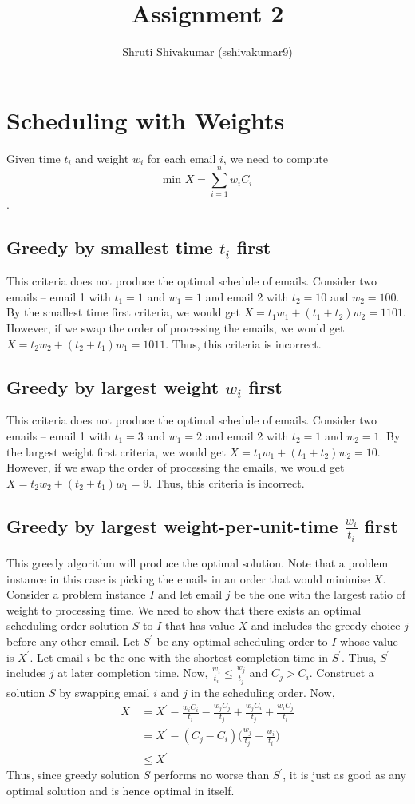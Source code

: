\documentclass[10pt,a4paper]{article}
\title{Assignment 2}
\author{Shruti Shivakumar (sshivakumar9)}
\begin{document}
\maketitle

\section{Scheduling with Weights}
Given time $t_i$ and weight $w_i$ for each email $i$, we need to compute $$\text{min } X = \sum_{i=1}^{n} w_iC_i$$.
\subsection{Greedy by smallest time $t_i$ first}
This criteria does not produce the optimal schedule of emails. Consider two emails -- email 1 with $t_1 = 1$ and $w_1 = 1$ and email 2 with $t_2 = 10$ and $w_2 = 100$. By the smallest time first criteria, we would get $X = t_1w_1 + (t_1 + t_2)w_2 = 1101$. However, if we swap the order of processing the emails, we would get $X = t_2w_2 + (t_2 + t_1)w_1 = 1011$. Thus, this criteria is incorrect.
\subsection{Greedy by largest weight $w_i$ first}
This criteria does not produce the optimal schedule of emails. Consider two emails -- email 1 with $t_1 = 3$ and $w_1 = 2$ and email 2 with $t_2 = 1$ and $w_2 = 1$. By the largest weight first criteria, we would get $X = t_1w_1 + (t_1 + t_2)w_2 = 10$. However, if we swap the order of processing the emails, we would get $X = t_2w_2 + (t_2 + t_1)w_1 = 9$. Thus, this criteria is incorrect.
\subsection{Greedy by largest weight-per-unit-time $\frac{w_i}{t_i}$ first}
This greedy algorithm will produce the optimal solution. Note that a problem instance in this case is picking the emails in an order that would minimise $X$. Consider a problem instance $I$ and let email $j$ be the one with the largest ratio of weight to processing time. We need to show that there exists an optimal scheduling order solution $S$ to $I$ that has value $X$ and includes the greedy choice $j$ before any other email. Let $S^\prime$ be any optimal scheduling order to $I$ whose value is $X^\prime$. Let email $i$ be the one with the shortest completion time in $S^\prime$. Thus, $S^\prime$ includes $j$ at later completion time. Now, $\frac{w_i}{t_i} \leq \frac{w_j}{t_j}$ and $C_j > C_i$. Construct a solution $S$ by swapping email $i$ and $j$ in the scheduling order. Now, 
\begin{align*}
X &= X^\prime - \frac{w_iC_i}{t_i} - \frac{w_jC_j}{t_j} + \frac{w_jC_i}{t_j} + \frac{w_iC_j}{t_i}\\
\quad &= X^\prime - (C_j - C_i)\Big(\frac{w_j}{t_j} - \frac{w_i}{t_i}\Big)\\
&\leq X^\prime
\end{align*}
Thus, since greedy solution $S$ performs no worse than $S^\prime$, it is just as good as any optimal solution and is hence optimal in itself. 
\end{document}
